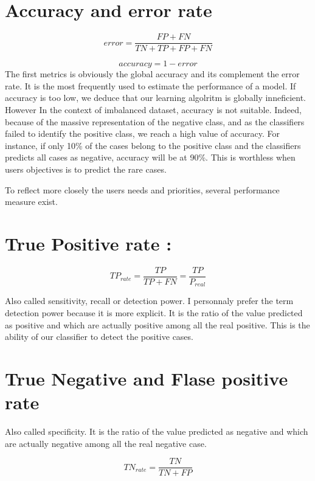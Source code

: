 \documentclass[
]{report}
\begin{document}
\hypertarget{accuracy-and-error-rate}{%
\section{Accuracy and error rate}\label{accuracy-and-error-rate}}

\[error = \frac{FP + FN}{TN+TP+FP+FN}\]

\[accuracy = 1 - error\]
The first metrics is obviously the global accuracy and its complement the error rate. It is the most frequently used to estimate the performance of a model. If accuracy is too low, we deduce that our learning algolritm is globally inneficient. However In the context of imbalanced dataset, accuracy is not suitable. Indeed, because of the massive representation of the negative class, and as the classifiers failed to identify the positive class, we reach a high value of accuracy. For instance, if only 10\% of the cases belong to the positive class and the classifiers predicts all cases as negative, accuracy will be at 90\%.
This is worthless when users objectives is to predict the rare cases.

To reflect more closely the users needs and priorities, several performance measure exist.

\hypertarget{true-positive-rate}{%
\section{True Positive rate :}\label{true-positive-rate}}

\[TP_{rate} = \frac{TP}{TP+FN} = \frac{TP}{P_{real}}\]

Also called sensitivity, recall or detection power. I personnaly prefer the term detection power because it is more explicit. It is the ratio of the value predicted as positive and which are actually positive among all the real positive. This is the ability of our classifier to detect the positive cases.

\hypertarget{true-negative-and-flase-positive-rate}{%
\section{True Negative and Flase positive rate}\label{true-negative-and-flase-positive-rate}}

Also called specificity. It is the ratio of the value predicted as negative and which are actually negative among all the real negative case.

\[TN_{rate} = \frac{TN}{TN+FP}\]
\end{document}

